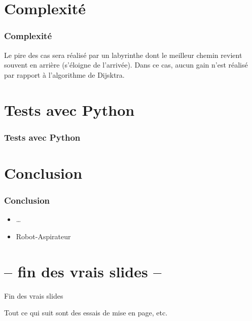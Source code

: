 \documentclass{beamer}
\begin{document}
\section{Complexité}
\begin{frame}
  \frametitle{Complexité}
  Le pire des cas sera réalisé par un labyrinthe dont le meilleur chemin revient
  souvent en arrière (s'éloigne de l'arrivée). Dans ce cas, aucun gain n'est
  réalisé par rapport à l'algorithme de Dijsktra.
\end{frame}

\section{Tests avec Python}
\begin{frame}
  \frametitle{Tests avec Python}
\end{frame}

\section{Conclusion}
\begin{frame}
  \frametitle{Conclusion}
  \begin{itemize}
  \item \ldots
  \item Robot-Aspirateur
  \end{itemize}
\end{frame}

\section*{-- fin des vrais slides --}

\begin{frame}
  \begin{center}
    {\Huge Fin des vrais slides}
    \par\bigskip
    Tout ce qui suit sont des essais de mise en page, etc.
  \end{center}
\end{frame}
\end{document}
